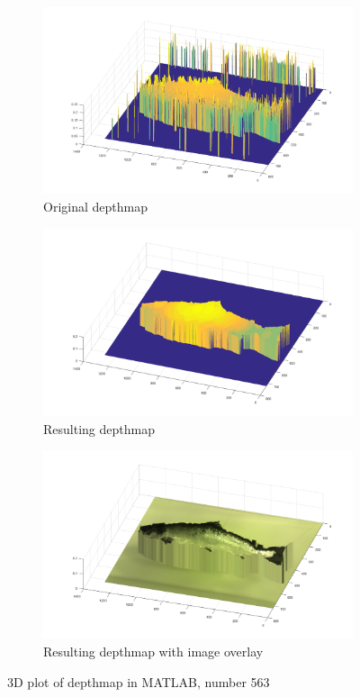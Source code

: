 \begin{figure}[H]
    \centering
    \begin{subfigure}{1\textwidth}
        \centering
        \includegraphics[width=.65\linewidth]{images/results/3D_plots/original_3D_63}
        \caption{Original depthmap} 
        \label{fig:3D_original_63}
    \end{subfigure}\hspace*{\fill}
    
    \medskip
    \begin{subfigure}{1\textwidth}
        \centering
        \includegraphics[width=.65\linewidth]{images/results/3D_plots/fixed_3D_63}
        \caption{Resulting depthmap} 
        \label{fig:3D_fixed_63}
    \end{subfigure}\hspace*{\fill}
    
    \medskip
    \begin{subfigure}{1\textwidth}
        \centering
        \includegraphics[width=.65\linewidth]{images/results/3D_plots/fixed_3D_fish_63}
        \caption{Resulting depthmap with image overlay} 
        \label{fig:3D_fixed_fish_63}
    \end{subfigure}\hspace*{\fill}
    \caption{3D plot of depthmap in MATLAB, number 563}
    \label{fig:3D_plot_63}
\end{figure}


